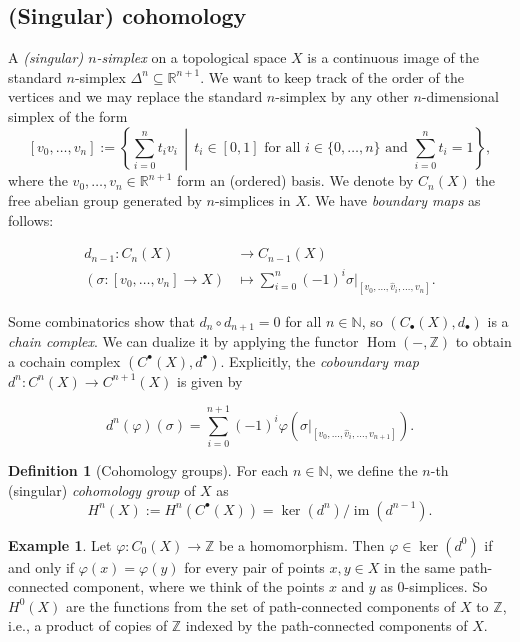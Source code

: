 \documentclass[12pt,a4paper]{amsart}
\theoremstyle{plain}
\theoremstyle{definition}
\newtheorem{defn}[thm]{Definition}
\newtheorem{exmp}[thm]{Example}
\theoremstyle{remark}
\begin{document}
\subsection{(Singular) cohomology}

A \emph{(singular) $n$-simplex} on a topological space $X$ is a continuous image of the standard $n$-simplex $\Delta^{n} \subseteq \mathbb{R}^{n+1}$.
We want to keep track of the order of the vertices and we may replace the standard $n$-simplex by any other $n$-dimensional simplex of the form
\[ [v_{0}, \ldots, v_{n}] := \left\{ \sum_{i = 0}^{n} t_{i}v_{i} \,\middle|\, t_{i} \in [0,1] \text{ for all } i \in \{0,\ldots, n\} \text{ and } \sum_{i = 0}^{n} t_{i} = 1 \right\}, \]
where the $v_{0}, \ldots, v_{n} \in \mathbb{R}^{n+1}$ form an (ordered) basis.
We denote by $C_{n}(X)$ the free abelian group generated by $n$-simplices in $X$.
We have \emph{boundary maps} as follows:

\begin{align*}
  d_{n-1} \colon C_{n}(X) & \longrightarrow C_{n-1}(X) \\
  (\sigma \colon [v_{0},\ldots,v_{n}] \to X) & \longmapsto \sum_{i = 0}^{n} (-1)^{i}\sigma|_{[v_{0}, \ldots, \hat{v}_{i}, \ldots, v_{n}]}.
\end{align*}

Some combinatorics \cite[Lemma 2.1]{hat02} show that $d_{n} \circ d_{n+1} = 0$ for all $n \in \mathbb{N}$, so $(C_{\bullet}(X),d_{\bullet})$ is a \emph{chain complex}.
We can dualize it by applying the functor $\operatorname{Hom}(-,\mathbb{Z})$ to obtain a cochain complex $(C^{\bullet}(X),d^{\bullet})$.
Explicitly, the \emph{coboundary map} $d^{n} \colon C^{n}(X) \to C^{n+1}(X)$ is given by

\begin{equation}\label{eqn:coboundary}
  d^{n}(\varphi)(\sigma) = \sum_{i = 0}^{n+1} (-1)^{i}\varphi(\sigma|_{[v_{0}, \ldots, \hat{v}_{i}, \ldots, v_{n+1}]}).
\end{equation}

\begin{defn}[Cohomology groups]
  For each $n \in \mathbb{N}$, we define the $n$-th (singular) \emph{cohomology group} of $X$ as
  \[ H^{n}(X) := H^{n}(C^{\bullet}(X)) = \ker(d^{n})/\operatorname{im}(d^{n-1}). \]
\end{defn}

\begin{exmp}
  Let $\varphi \colon C_{0}(X) \to \mathbb{Z}$ be a homomorphism.
  Then $\varphi \in \ker(d^{0})$ if and only if $\varphi(x) = \varphi(y)$ for every pair of points $x, y \in X$ in the same path-connected component, where we think of the points $x$ and $y$ as $0$-simplices.
  So $H^{0}(X)$ are the functions from the set of path-connected components of $X$ to $\mathbb{Z}$, i.e., a product of copies of $\mathbb{Z}$ indexed by the path-connected components of $X$.
\end{exmp}
\end{document}
